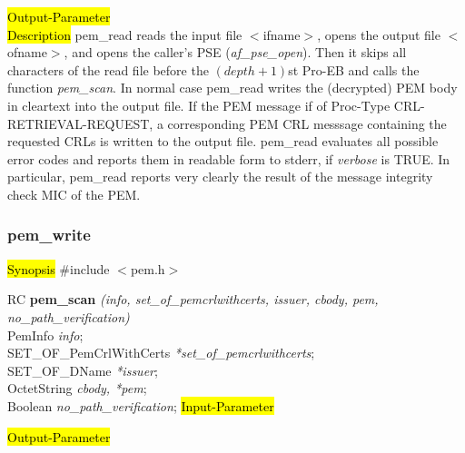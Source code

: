 \hl{Output-Parameter}
 \\
\hl{Description}
pem\_read reads the input file $<$ifname$>$,
opens the output file $<$ofname$>$,
and opens the caller's PSE ({\em af\_pse\_open}).
Then it skips all characters of the read file before the
$(depth+1)$st Pro-EB
and calls the function {\em pem\_scan}.
In normal case pem\_read writes the (decrypted) PEM body in cleartext into the output file.
If the PEM message if of Proc-Type CRL-RETRIEVAL-REQUEST, a corresponding PEM CRL messsage
containing the requested CRLs is written to the output file.
pem\_read evaluates all possible error codes and reports
them in readable form to stderr, if {\em verbose } is TRUE.
In particular, pem\_read reports very clearly
the result of the message integrity check MIC of the PEM.

\subsubsection{pem\_write}
\label{pem_scan}
\hl{Synopsis}
\#include $<$pem.h$>$ 

RC {\bf pem\_scan} {\em (info, set\_of\_pemcrlwithcerts, issuer, cbody, pem, no\_path\_verification)} \\
PemInfo {\em *info}; \\
SET\_OF\_PemCrlWithCerts {\em **set\_of\_pemcrlwithcerts}; \\
SET\_OF\_DName 	{\em **issuer}; \\
OctetString {\em *cbody, *pem}; \\
Boolean {\em *no\_path\_verification};
\hl{Input-Parameter}

\hl{Output-Parameter}

